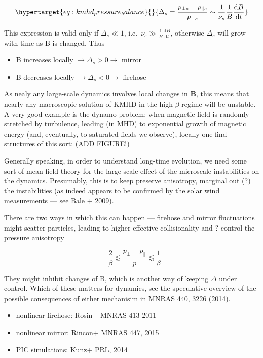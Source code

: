 \documentclass[
  notoc %
]{tufte-book}
\providecommand{\tightlist}{%
  \setlength{\itemsep}{0pt}\setlength{\parskip}{0pt}
}
\begin{document}
\begin{equation}\protect\hypertarget{eq:kmhd_pressure_balance}{}{
\Delta_s = \frac{p_{\perp s} - p_{\parallel s}}{p_{\perp s}} \sim\frac{1}{\nu_s}\frac{1}{B}\frac{\mathrm{d}B}{\mathrm{d}t}
}\label{eq:kmhd_pressure_balance}\end{equation}

This expression is valid only if \(\Delta_s\ll 1\),
i.e.~\(\nu_s\gg \frac{1}{B}\frac{\mathrm{d}B}{\mathrm{d}t}\), otherwise
\(\Delta_s\) will grow with time as B is changed. Thus

\begin{itemize}
\tightlist
\item
  B increases locally \(\rightarrow \Delta_s >0 \rightarrow\) mirror
\item
  B decreases locally \(\rightarrow \Delta_s <0 \rightarrow\) firehose
\end{itemize}

As nealy any large-scale dynamics involves local changes in
\(\mathbf{B}\), this means that nearly any macroscopic solution of KMHD
in the high-\(\beta\) regime will be unstable. A very good example is
the dynamo problem: when magnetic field is randomly stretched by
turbulence, leading (in MHD) to exponential growth of magnetic energy
(and, eventually, to saturated fields we observe), locally one find
structures of this sort: (ADD FIGURE!)

Generally speaking, in order to understand long-time evolution, we need
some sort of mean-field theory for the large-scale effect of the
microscale instabilities on the dynamics. Presumably, this is to keep
preserve anisotropy, marginal out (?) the instabilities (as indeed
appears to be confirmed by the solar wind measurements --- see Bale +
2009).

There are two ways in which this can happen --- firehose and mirror
fluctuations might scatter particles, leading to higher effective
collisionality and ? control the pressure anisotropy

\[
-\frac{2}{\beta}\lesssim \frac{p_\perp - p_\parallel}{p}\lesssim \frac{1}{\beta}
\]

They might inhibit changes of B, which is another way of keeping
\(\Delta\) under control. Which of these matters for dynamics, see the
speculative overview of the possible consequences of either mechanisim
in MNRAS 440, 3226 (2014).

\begin{itemize}
\tightlist
\item
  nonlinear firehose: Rosin+ MNRAS 413 2011
\item
  nonlinear mirror: Rincon+ MNRAS 447, 2015
\item
  PIC simulations: Kunz+ PRL, 2014
\end{itemize}
\end{document}

